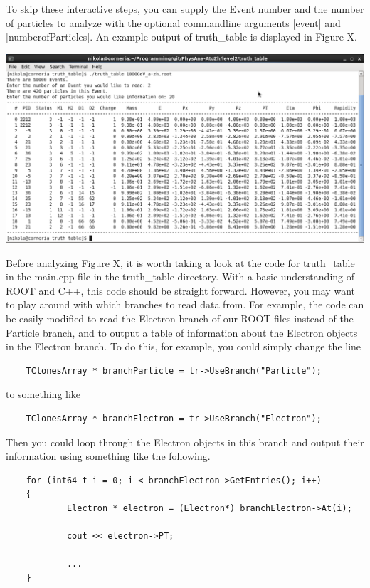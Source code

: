 \documentclass{article}
\begin{document}
\bigskip

To skip these interactive steps, you can supply the Event number and the number of particles to analyze with the optional commandline arguments [event] and [numberofParticles]. An example output of truth\_table is displayed in Figure X.

\bigskip

\includegraphics[width = \linewidth]{truth_table_screenshot.png}

\bigskip

Before analyzing Figure X, it is worth taking a look at the code for truth\_table in the main.cpp file in the truth\_table directory. With a basic understanding of ROOT and C++, this code should be straight forward. However, you may want to play around with which branches to read data from. For example, the code can be easily modified to read the Electron branch of our ROOT files instead of the Particle branch, and to output a table of information about the Electron objects in the Electron branch. To do this, for example, you could simply change the line

\begin{verbatim}
	TClonesArray * branchParticle = tr->UseBranch("Particle");
\end{verbatim}

to something like

\begin{verbatim}
	TClonesArray * branchElectron = tr->UseBranch("Electron");
\end{verbatim}

Then you could loop through the Electron objects in this branch and output their information using something like the following.

\begin{verbatim}
	for (int64_t i = 0; i < branchElectron->GetEntries(); i++)
	{
	        Electron * electron = (Electron*) branchElectron->At(i);

	        cout << electron->PT;

	        ...
	}
\end{verbatim}
\end{document}
